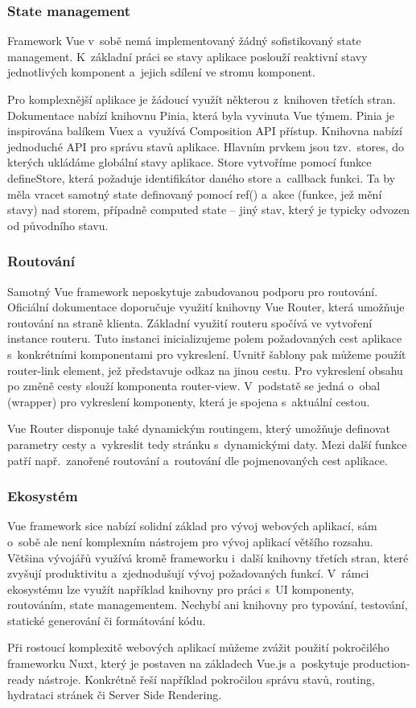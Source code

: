 \subsubsection{State management}

Framework Vue v~sobě nemá implementovaný žádný sofistikovaný state management. 
K~základní práci se stavy aplikace poslouží reaktivní stavy jednotlivých komponent a~jejich sdílení ve stromu komponent.

Pro komplexnější aplikace je žádoucí využít některou z~knihoven třetích stran. Dokumentace nabízí knihovnu Pinia, která byla vyvinuta Vue týmem. 
Pinia je inspirována balíkem Vuex a~využívá Composition API přístup. Knihovna nabízí jednoduché API pro správu stavů aplikace. 
Hlavním prvkem jsou tzv.~stores, do kterých ukládáme globální stavy aplikace. 
Store vytvoříme pomocí funkce defineStore, která požaduje identifikátor daného store a~callback funkci. 
Ta by měla vracet samotný state definovaný pomocí ref() a~akce (funkce, jež mění stavy) nad storem, případně computed state -- jiný stav, který je typicky odvozen od původního stavu.\cite{pinia,vue}

\subsubsection{Routování}

Samotný Vue framework neposkytuje zabudovanou podporu pro routování. Oficiální dokumentace doporučuje využití knihovny Vue Router, která umožňuje routování na straně klienta. 
Základní využití routeru spočívá ve vytvoření instance routeru. Tuto instanci inicializujeme polem požadovaných cest aplikace s~konkrétními komponentami pro vykreslení. 
Uvnitř šablony pak můžeme použít router-link element, jež představuje odkaz na jinou cestu. Pro vykreslení obsahu po změně cesty slouží komponenta router-view. 
V~podstatě se jedná o~obal (wrapper) pro vykreslení komponenty, která je spojena s~aktuální cestou.

Vue Router disponuje také dynamickým routingem, který umožňuje definovat parametry cesty a~vykreslit tedy stránku s~dynamickými daty. 
Mezi další funkce patří např.~zanořené routování a~routování dle pojmenovaných cest aplikace.\cite{vue,vuerouter}

\subsubsection{Ekosystém}

Vue framework sice nabízí solidní základ pro vývoj webových aplikací, sám o~sobě ale není komplexním nástrojem pro vývoj aplikací většího rozsahu. 
Většina vývojářů využívá kromě frameworku i~další knihovny třetích stran, které zvyšují produktivitu a~zjednodušují vývoj požadovaných funkcí. 
V~rámci ekosystému lze využít například knihovny pro práci s~UI komponenty, routováním, state managementem. 
Nechybí ani knihovny pro typování, testování, statické generování či formátování kódu.

Při rostoucí komplexitě webových aplikací můžeme zvážit použití pokročilého frameworku Nuxt, který je postaven na základech Vue.js a~poskytuje production-ready nástroje. 
Konkrétně řeší například pokročilou správu stavů, routing, hydrataci stránek či Server Side Rendering.\cite{awesomevue,vue}